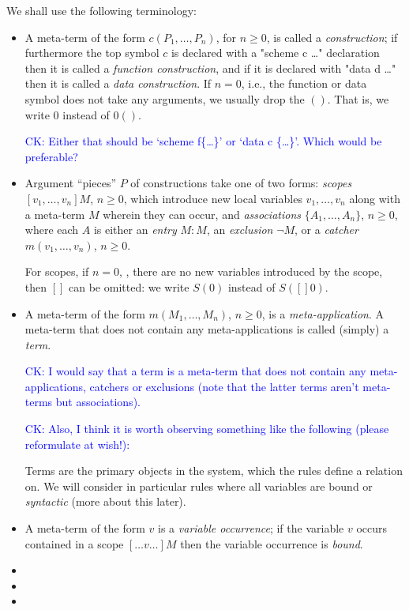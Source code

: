 \documentclass[letterpaper,11pt]{article}
\newcommand{\CK}[1]{\textcolor{blue}{CK: #1}}
\begin{document}
We shall use the following terminology:
\begin{itemize}

\item A meta-term of the form $c(P_1,…,P_n)$, for $n≥0$, is called a \emph{construction}; if furthermore
  the top symbol $c$ is declared with a "scheme c {…}" declaration then it is called a
  \emph{function construction}, and if it is declared with "data d {…}" then it is called a
  \emph{data construction}. If $n=0$, i.e., the function or data symbol does not take any arguments,
  we usually drop the $()$. That is, we write $0$ instead of $0()$.

  \CK{Either that should be `scheme f\{…\}' or `data c \{…\}'.  Which would be preferable?}

\item Argument ``pieces'' $P$ of constructions take one of two forms: \emph{scopes} $[v_1,…,v_n]M$,
  $n≥0$, which introduce new local variables $v_1,…,v_n$ along with a meta-term $M$ wherein they can
  occur, and \emph{associations} $\{A_1,…,A_n\}$, $n≥0$, where each $A$ is either an \emph{entry}
  $M:M$, an \emph{exclusion} $¬M$, or a \emph{catcher} $m(v_1,…,v_n)$, $n≥0$.

  For scopes, if $n=0$, \ie, there are no new variables introduced by the scope, then $[]$ can be
  omitted: we write $S(0)$ instead of $S([]0)$.

\item A meta-term of the form $m(M_1,…,M_n)$, $n≥0$, is a \emph{meta-application}.  A meta-term that
  does not contain any meta-applications is called (simply) a \emph{term}.

  \CK{I would say that a term is a meta-term that does not contain any meta-applications, catchers
  or exclusions (note that the latter terms aren't meta-terms but associations).}

  \CK{Also, I think it is worth observing something like the following (please reformulate at
  wish!):}

  Terms are the primary objects in the system, which the rules define a relation on.
  We will consider in particular rules where all variables are bound or \emph{syntactic}
  (more about this later).

\item A meta-term of the form $v$ is a \emph{variable occurrence}; if the variable $v$ occurs contained
  in a scope $[…v…]M$ then the variable occurrence is \emph{bound}.

\item {}

\item {}

\item {}

\end{itemize}
\end{document}
